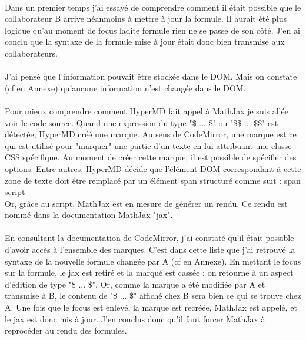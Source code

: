 \documentclass[12pt]{article}
\begin{document}
\paragraph{}
Dans un premier temps j'ai essayé de comprendre comment il était possible que le collaborateur B arrive néanmoins à mettre à jour la formule. Il aurait été plus logique qu'au moment de focus ladite formule rien ne se passe de son côté. J'en ai conclu que la syntaxe de la formule mise à jour était donc bien transmise aux collaborateurs.
\paragraph{}
J'ai pensé que l'information pouvait être stockée dans le DOM. Mais on constate (cf en Annexe) qu'aucune information n'est changée dans le DOM.
\paragraph{}
Pour mieux comprendre comment HyperMD fait appel à MathJax je suis allée voir le code source. Quand une expression du type "\$ ... \$" ou "\$\$ ... \$\$" est détectée, HyperMD créé une marque. Au sens de CodeMirror, une marque est ce qui est utilisé pour "marquer" une partie d'un texte en lui attribuant une classe CSS spécifique. Au moment de créer cette marque, il est possible de spécifier des options. Entre autres, HyperMD décide que l'élément DOM correspondant à cette zone de texte doit être remplacé par un élément span structuré comme suit :
span
    script\\
Or, grâce au script, MathJax est en mesure de générer un rendu. Ce rendu est nommé dans la documentation MathJax "jax".
\paragraph{}
En consultant la documentation de CodeMirror, j'ai constaté qu'il était possible d'avoir accès à l'ensemble des marques. C'est dans cette liste que j'ai retrouvé la syntaxe de la nouvelle formule changée par A (cf en Annexe). En mettant le focus sur la formule, le jax est retiré et la marqué est cassée : on retourne à un aspect d'édition de type "\$ ... \$". Or, comme la marque a été modifiée par A et transmise à B, le contenu de "\$ ... \$" affiché chez B sera bien ce qui se trouve chez A. Une fois que le focus est enlevé, la marque est recréée, MathJax est appelé, et le jax est donc mis à jour. J'en conclus donc qu'il faut forcer MathJax à reprocéder au rendu des formules.\\
\end{document}
